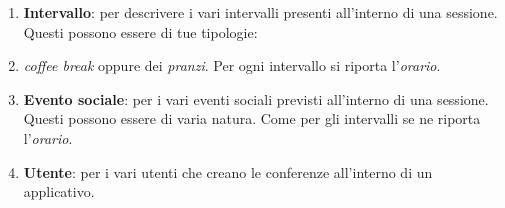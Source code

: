 \begin{enumerate}
\item \textbf{Intervallo}: per descrivere i vari intervalli presenti all'interno di una sessione. Questi possono essere di tue tipologie: \item \textit{coffee break} oppure dei \textit{pranzi}. Per ogni intervallo si riporta l'\textit{orario}. 
\item \textbf{Evento sociale}: per i vari eventi sociali previsti all'interno di una sessione. Questi possono essere di varia natura. Come per gli intervalli se ne riporta l'\textit{orario}.
\item \textbf{Utente}: per i vari utenti che creano le conferenze all'interno di un applicativo. 
\end{enumerate}